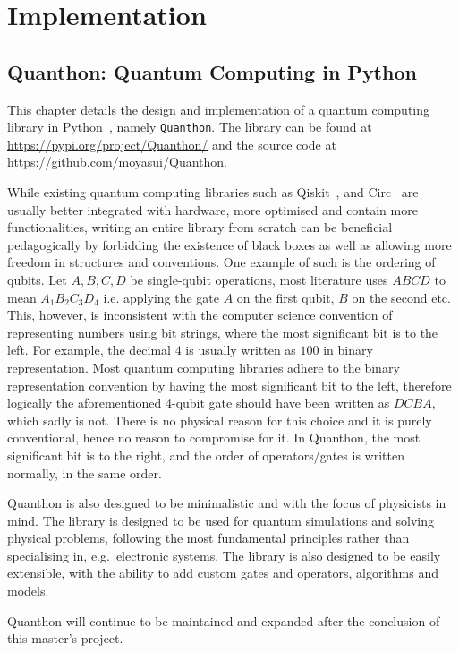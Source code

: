 \part{Implementation}
\chapter{Quanthon: Quantum Computing in Python}
\label{ch:quanthon}

This chapter details the design and implementation of a quantum computing library in Python~\cite{python3}, namely \texttt{Quanthon}. The library can be found at \url{https://pypi.org/project/Quanthon/} and the source code at \url{https://github.com/moyasui/Quanthon}.

While existing quantum computing libraries such as Qiskit~\cite{qiskit}, and Circ~\cite{cirq_2024} are usually better integrated with hardware, more optimised and contain more functionalities, writing an entire library from scratch can be beneficial pedagogically by forbidding the existence of black boxes as well as allowing more freedom in structures and conventions. One example of such is the ordering of qubits. Let $ A, B,C,D $ be single-qubit operations, most literature uses $ ABCD $ to mean $ A_1B_2C_3D_4 $ i.e. applying the gate $ A $ on the first qubit, $ B $ on the second etc. This, however, is inconsistent with the computer science convention of representing numbers using bit strings, where the most significant bit is to the left. For example, the decimal $ 4 $ is usually written as $ 100 $ in binary representation. Most quantum computing libraries adhere to the binary representation convention by having the most significant bit to the left, therefore logically the aforementioned 4-qubit gate should have been written as $ DCBA $, which sadly is not. There is no physical reason for this choice and it is purely conventional, hence no reason to compromise for it. In Quanthon, the most significant bit is to the right, and the order of operators/gates is written normally, in the same order.  

Quanthon is also designed to be minimalistic and with the focus of physicists in mind. The library is designed to be used for quantum simulations and solving physical problems, following the most fundamental principles rather than specialising in, e.g.\ electronic systems. The library is also designed to be easily extensible, with the ability to add custom gates and operators, algorithms and models. 

Quanthon will continue to be maintained and expanded after the conclusion of this master's project. 

